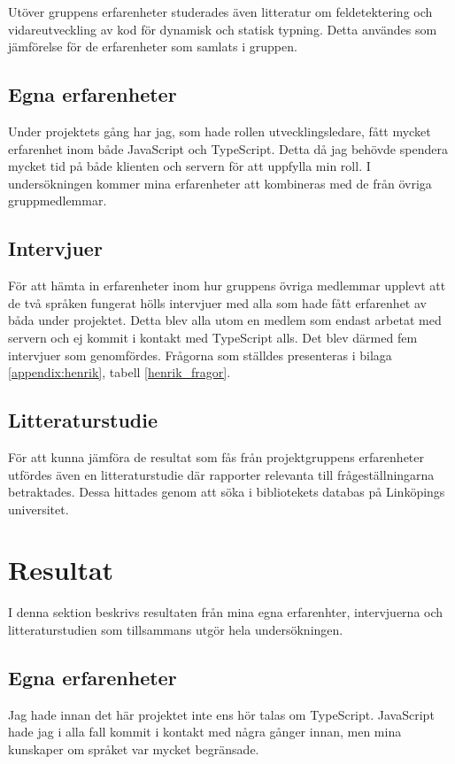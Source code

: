Utöver gruppens erfarenheter studerades även litteratur om feldetektering och vidareutveckling av kod för dynamisk och statisk typning. Detta användes som jämförelse för de erfarenheter som samlats i gruppen.

\subsection{Egna erfarenheter}
Under projektets gång har jag, som hade rollen utvecklingsledare, fått mycket erfarenhet inom både JavaScript och TypeScript. Detta då jag behövde spendera mycket tid på både klienten och servern för att uppfylla min roll. I undersökningen kommer mina erfarenheter att kombineras med de från övriga gruppmedlemmar.

\subsection{Intervjuer}
För att hämta in erfarenheter inom hur gruppens övriga medlemmar upplevt att de två språken fungerat hölls intervjuer med alla som hade fått erfarenhet av båda under projektet. Detta blev alla utom en medlem som endast arbetat med servern och ej kommit i kontakt med TypeScript alls. Det blev därmed fem intervjuer som genomfördes. Frågorna som ställdes presenteras i bilaga \ref{appendix:henrik}, tabell \ref{henrik_fragor}.

\subsection{Litteraturstudie}
För att kunna jämföra de resultat som fås från projektgruppens erfarenheter utfördes även en litteraturstudie där rapporter relevanta till frågeställningarna betraktades. Dessa hittades genom att söka i bibliotekets databas på Linköpings universitet. 

\section{Resultat}
I denna sektion beskrivs resultaten från mina egna erfarenhter, intervjuerna och litteraturstudien som tillsammans utgör hela undersökningen.
\subsection{Egna erfarenheter}
Jag hade innan det här projektet inte ens hör talas om TypeScript. JavaScript hade jag i alla fall kommit i kontakt med några gånger innan, men mina kunskaper om språket var mycket begränsade.

